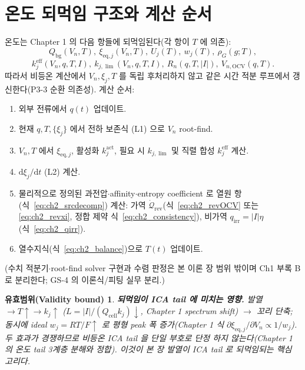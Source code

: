 \documentclass[11pt,a4paper]{article}
\newtheorem*{boundbox}{유효범위(Validity bound)}
\newcommand{\dd}{\mathrm{d}}
\newcommand{\eff}{\mathrm{eff}}
\newcommand{\eq}{\mathrm{eq}}
\newcommand{\bg}{\mathrm{bg}}
\newcommand{\cell}{\mathrm{cell}}
\newcommand{\OCV}{\mathrm{OCV}}
\newcommand{\irr}{\mathrm{irr}}
\newcommand{\rev}{\mathrm{rev}}
\begin{document}
\section{온도 되먹임 구조와 계산 순서}\label{sec:ch2_feedback}
온도는 Chapter 1 의 다음 항들에 되먹임된다(각 항이 $T$ 에 의존):
\begin{equation}
Q_\bg(V_n,T),\ \xi_{\eq,j}(V_n,T),\ U_j(T),\ w_j(T),\ \rho_G(g;T),
\label{eq:ch2_feedT1}
\end{equation}
\begin{equation}
k_j^{\eff}(V_n,q,T,I),\ k_{j,\lim}(V_n,q,T,I),\ R_n(q,T,|I|),\ V_{n,\OCV}(q,T).
\label{eq:ch2_feedT2}
\end{equation}
따라서 비등온 계산에서 $V_n,\xi_j,T$ 를 독립 후처리하지 않고 같은 시간 적분 루프에서 갱신한다(P3-3 순환
의존성). 계산 순서:
\begin{enumerate}[label=\arabic*),leftmargin=2.0em]
\item 외부 전류에서 $q(t)$ 업데이트.
\item 현재 $q,T,\{\xi_j\}$ 에서 전하 보존식 (L1) 으로 $V_n$ root-find.
\item $V_n,T$ 에서 $\xi_{\eq,j}$, 활성화 $k_j^{\mathrm{act}}$, 필요 시 $k_{j,\lim}$ 및 직렬 합성 $k_j^{\eff}$ 계산.
\item $\dd\xi_j/\dd t$ (L2) 계산.
\item 물리적으로 정의된 과전압$\cdot$affinity$\cdot$entropy coefficient 로 열원 항(식~\eqref{eq:ch2_srcdecomp}) 계산:
  가역 $\dot{\mathcal Q}_{\rev}$(식~\eqref{eq:ch2_revOCV} 또는 \eqref{eq:ch2_revxi}, 정합 제약 식~\eqref{eq:ch2_consistency}),
  비가역 $q_\irr=|I|\eta$(식~\eqref{eq:ch2_qirr}).
\item 열수지식(식~\eqref{eq:ch2_balance})으로 $T(t)$ 업데이트.
\end{enumerate}
(수치 적분기$\cdot$root-find solver 구현과 수렴 판정은 본 이론 장 범위 밖이며 Ch1 부록 B 로 분리한다; GS-4 의
이론식/피팅 실무 분리.)
\begin{boundbox}
\textbf{되먹임이 ICA tail 에 미치는 영향.} 발열 $\to T\uparrow\to k_j\uparrow$ ($L=|I|/(Q_\cell k_j)\downarrow$,
Chapter 1 spectrum shift) $\to$ 꼬리 단축; 동시에 ideal $w_j=RT/F\uparrow$ 로 평형 peak 폭 증가(Chapter 1
식 $\partial\xi_{\eq,j}/\partial V_n\propto1/w_j$). 두 효과가 경쟁하므로 비등온 ICA tail 을 단일 부호로 단정
하지 않는다(Chapter 1 의 온도 tail 3계층 분해와 정합). 이것이 본 장 발열이 ICA tail 로 되먹임되는 핵심 고리다.
\end{boundbox}
\end{document}
